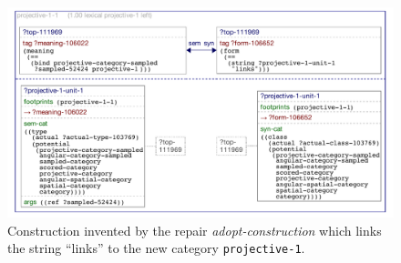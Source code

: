 \begin{figure}
\begin{center}
\includegraphics[width=1\columnwidth]{figs/category-acquisition-projective-adopted-cxn-left}
\end{center}
\caption[Construction invented by the repair \emph{adopt-construction}]{Construction invented by the repair \emph{adopt-construction} 
which links the string ``links'' to the new category {\footnotesize\tt projective-1}.}
\label{f:category-acquisition-projective-single-acquisition-cxn}
\end{figure}


